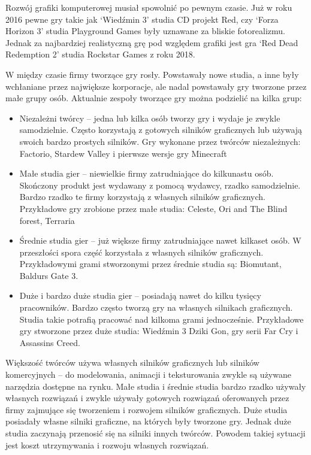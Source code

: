 \documentclass[12pt,twoside]{article}
\begin{document}
Rozwój grafiki komputerowej musiał spowolnić po pewnym czasie. Już w roku
2016 pewne gry takie jak ‘Wiedźmin 3’ studia CD projekt Red, czy ‘Forza Horizon
3’ studia Playground Games były uznawane za bliskie fotorealizmu. Jednak za
najbardziej realistyczną grę pod względem grafiki jest gra ‘Red Dead Redemption
2’ studia Rockstar Games z roku 2018. 

W między czasie firmy tworzące gry rosły. Powstawały nowe studia, a inne były
wchłaniane przez największe korporacje, ale nadal powstawały gry tworzone przez
małe grupy osób. Aktualnie zespoły tworzące gry można podzielić na kilka grup: 

\begin {itemize}

\item Niezależni twórcy -- jedna lub kilka osób tworzy gry i wydaje je
zwykle samodzielnie. Często korzystają z gotowych silników graficznych lub
używają swoich bardzo prostych silników. Gry wykonane przez twórców
niezależnych: Factorio, Stardew Valley i pierwsze wersje gry Minecraft

\item Małe studia gier -- niewielkie firmy zatrudniające do kilkunastu
osób. Skończony produkt jest wydawany z pomocą wydawcy, rzadko samodzielnie.
Bardzo rzadko te firmy korzystają z własnych silników graficznych. Przykładowe
gry zrobione przez małe studia: Celeste, Ori and The Blind forest, Terraria

\item Średnie studia gier -- już większe firmy zatrudniające nawet
kilkaset osób. W przeszłości spora część korzystała z własnych silników
graficznych. Przykładowymi grami stworzonymi przez średnie studia są: Biomutant,
Baldurs Gate 3.

\item Duże i bardzo duże studia gier -- posiadają nawet do kilku
tysięcy pracowników. Bardzo często tworzą gry na własnych silnikach graficznych.
Studia takie potrafią pracować nad kilkoma grami jednocześnie. Przykładowe gry
stworzone przez duże studia: Wiedźmin 3 Dziki Gon, gry serii Far Cry i Assassins
Creed. 

\end{itemize} 

Większość twórców używa własnych silników graficznych lub silników komercyjnych
– do modelowania, animacji i teksturowania zwykle są używane narzędzia dostępne
na rynku. Małe studia i średnie studia bardzo rzadko używały własnych rozwiązań
i zwykle używały gotowych rozwiązań oferowanych przez firmy zajmujące się
tworzeniem i rozwojem silników graficznych. Duże studia posiadały własne silniki
graficzne, na których były tworzone gry. Jednak duże studia zaczynają przenosić
się na silniki innych twórców. Powodem takiej sytuacji jest koszt utrzymywania i
rozwoju własnych rozwiązań. 
\end{document}
